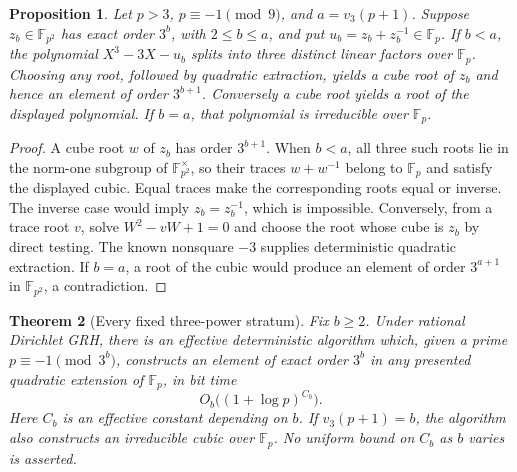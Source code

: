 \documentclass[11pt]{article}
\newtheorem{theorem}{Theorem}[section]
\newtheorem{proposition}[theorem]{Proposition}
\theoremstyle{definition}
\theoremstyle{remark}
\begin{document}
\begin{proposition}\label{prop:kummer-trace-cubic-lift}
Let \(p>3\), \(p\equiv-1\pmod9\), and
\(a=v_3(p+1)\). Suppose \(z_b\in\mathbb F_{p^2}\) has
exact order \(3^b\), with \(2\le b\le a\), and put
\(u_b=z_b+z_b^{-1}\in\mathbb F_p\).
If \(b<a\), the polynomial \(X^3-3X-u_b\) splits into
three distinct linear factors over \(\mathbb F_p\).
Choosing any root, followed by quadratic extraction, yields a
cube root of \(z_b\) and hence an element of order
\(3^{b+1}\). Conversely a cube root yields a root of the
displayed polynomial. If \(b=a\), that polynomial is
irreducible over \(\mathbb F_p\).
\end{proposition}
\begin{proof}
A cube root \(w\) of \(z_b\) has order \(3^{b+1}\).
When \(b<a\), all three such roots lie in the norm-one
subgroup of \(\mathbb F_{p^2}^\times\), so their traces
\(w+w^{-1}\) belong to \(\mathbb F_p\) and satisfy the
displayed cubic. Equal traces make the corresponding roots
equal or inverse. The inverse case would imply
\(z_b=z_b^{-1}\), which is impossible. Conversely, from a
trace root \(v\), solve \(W^2-vW+1=0\) and choose the root
whose cube is \(z_b\) by direct testing. The known nonsquare
\(-3\) supplies deterministic quadratic extraction. If
\(b=a\), a root of the cubic would produce an element of
order \(3^{a+1}\) in \(\mathbb F_{p^2}\), a contradiction.
\end{proof}

\begin{theorem}[Every fixed three-power stratum]\label{thm:kummer-fixed-three-power-stratum}
Fix \(b\ge2\). Under rational Dirichlet GRH, there is an
effective deterministic algorithm which, given a prime
\(p\equiv-1\pmod{3^b}\), constructs an element of exact order
\(3^b\) in any presented quadratic extension of
\(\mathbb F_p\), in bit time
\[
 O_b\bigl((1+\log p)^{C_b}\bigr).
\]
Here \(C_b\) is an effective constant depending on \(b\).
If \(v_3(p+1)=b\), the algorithm also constructs an irreducible
cubic over \(\mathbb F_p\). No uniform bound on \(C_b\)
as \(b\) varies is asserted.
\end{theorem}
\end{document}
